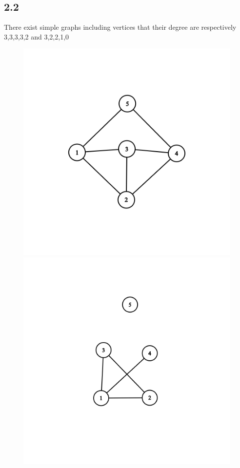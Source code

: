 \documentclass{article}
\begin{document}
\subsection*{2.2}
There exist simple graphs including vertices that their degree are respectively 3,3,3,3,2 and 3,2,2,1,0
\begin{figure}[h]
    \includegraphics[scale = 0.4]{problem_2/graph_2.2.1.png}
    \includegraphics[scale = 0.4]{problem_2/graph_2.2.2.png}
\end{figure}
\newpage
\end{document}
